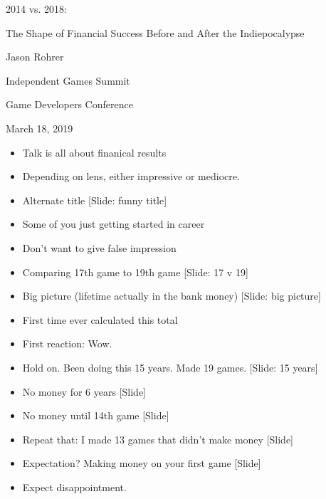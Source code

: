 \documentclass[12pt]{article}
\begin{document}
\begin{center}
2014 vs. 2018:

The Shape of Financial Success Before and After the Indiepocalypse

Jason Rohrer

Independent Games Summit

Game Developers Conference 

March 18, 2019
\end{center}


{\Huge



\begin{itemize}

\item Talk is all about finanical results

\item Depending on lens, either impressive or mediocre.

\item Alternate title [Slide: funny title]

\item Some of you just getting started in career

\item Don't want to give false impression

\item Comparing 17th game to 19th game [Slide:  17 v 19]

\item Big picture (lifetime actually in the bank money) [Slide: big picture]

\item First time ever calculated this total

\item First reaction:  Wow.

\item Hold on.  Been doing this 15 years.  Made 19 games.  [Slide: 15 years]

\item No money for 6 years [Slide]

\item No money until 14th game [Slide]

\item Repeat that:  I made 13 games that didn't make money [Slide]

\item Expectation?  Making money on your first game [Slide]

\item Expect disappointment.


\end{itemize}}
\end{document}
